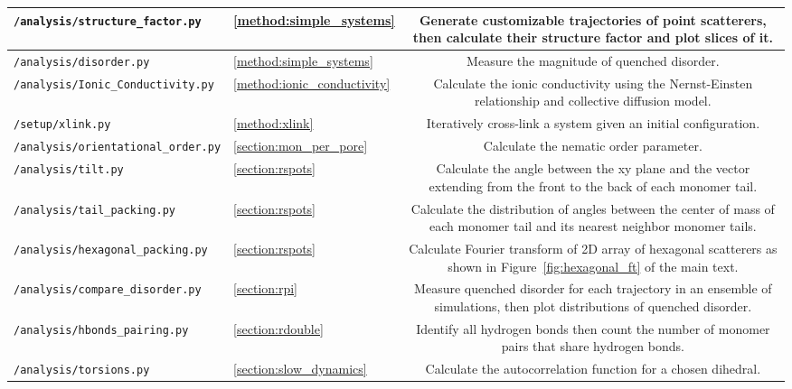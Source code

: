 \begin{table}[htb!]
\begin{tabular}{|A|B|C|}
  \texttt{/analysis/structure\_factor.py} & \ref{method:simple_systems} & Generate customizable
  trajectories of point scatterers, then calculate their structure factor and plot slices of it.
  \\ \hline 
  
  \texttt{/analysis/disorder.py} & \ref{method:simple_systems} & Measure the magnitude of
  quenched disorder. \\ \hline
  
  \texttt{/analysis/Ionic\_Conductivity.py} & \ref{method:ionic_conductivity} & Calculate the 
  ionic conductivity using the Nernst-Einsten relationship and collective diffusion model. \\ \hline
  
  \texttt{/setup/xlink.py} & \ref{method:xlink} & Iteratively cross-link a system given an 
  initial configuration. \\ \hline
    
  \texttt{/analysis/orientational\_order.py} & \ref{section:mon_per_pore} & Calculate the 
  nematic order parameter. \\ \hline
  
  \texttt{/analysis/tilt.py} & \ref{section:rspots} & Calculate the angle between the xy plane
  and the vector extending from the front to the back of each monomer tail. \\ \hline
  
  \texttt{/analysis/tail\_packing.py} & \ref{section:rspots} & Calculate the distribution of
  angles between the center of mass of each monomer tail and its nearest neighbor monomer tails.
  \\ \hline
 
  \texttt{/analysis/hexagonal\_packing.py} & \ref{section:rspots} & Calculate Fourier transform of
  2D array of hexagonal scatterers as shown in Figure~\ref{fig:hexagonal_ft} of the main text. \\ \hline
 
  \texttt{/analysis/compare\_disorder.py} & \ref{section:rpi} & Measure quenched disorder for
  each trajectory in an ensemble of simulations, then plot distributions of quenched disorder.
  \\ \hline
  
  \texttt{/analysis/hbonds\_pairing.py} & \ref{section:rdouble} & Identify all hydrogen bonds
  then count the number of monomer pairs that share hydrogen bonds. \\ \hline
  
  \texttt{/analysis/torsions.py} & \ref{section:slow_dynamics} & Calculate the autocorrelation
  function for a chosen dihedral. \\ \hline
  

\end{tabular}
\end{table}

